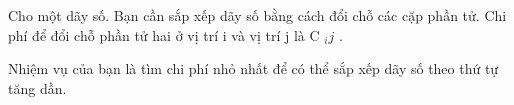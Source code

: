 Cho một dãy số. Bạn cần sắp xếp dãy số bằng cách đổi chỗ các cặp phần tử. Chi phí để đổi chỗ phần tử hai ở vị trí i và vị trí j là C $_ ij $ .

Nhiệm vụ của bạn là tìm chi phí nhỏ nhất để có thể sắp xếp dãy số theo thứ tự tăng dần.